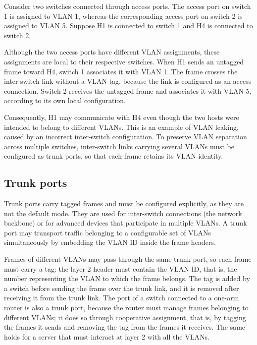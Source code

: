 \begin{center}
\end{center}
Consider two switches connected through access ports. The access port on switch 1 is assigned to VLAN 1, whereas the corresponding access port on switch 2 is assigned to VLAN 5. Suppose H1 is connected to switch 1 and H4 is connected to switch 2.

Although the two access ports have different VLAN assignments, these assignments are local to their respective switches. When H1 sends an untagged frame toward H4, switch 1 associates it with VLAN 1. The frame crosses the inter-switch link without a VLAN tag, because the link is configured as an access connection. Switch 2 receives the untagged frame and associates it with VLAN 5, according to its own local configuration.

Consequently, H1 may communicate with H4 even though the two hosts were intended to belong to different VLANs. This is an example of VLAN leaking, caused by an incorrect inter-switch configuration. To preserve VLAN separation across multiple switches, inter-switch links carrying several VLANs must be configured as trunk ports, so that each frame retains its VLAN identity.

\subsection{Trunk ports}

Trunk ports carry tagged frames and must be configured explicitly, as they are not the default mode. They are used for inter-switch connections (the network backbone) or for advanced devices that participate in multiple VLANs. A trunk port may transport traffic belonging to a configurable set of VLANs simultaneously by embedding the VLAN ID inside the frame headers.


Frames of different VLANs may pass through the same trunk port, so each frame must carry a tag: the layer 2 header must contain the VLAN ID, that is, the number representing the VLAN to which the frame belongs. The tag is added by a switch before sending the frame over the trunk link, and it is removed after receiving it from the trunk link. The port of a switch connected to a one-arm router is also a trunk port, because the router must manage frames belonging to different VLANs; it does so through cooperative assignment, that is, by tagging the frames it sends and removing the tag from the frames it receives. The same holds for a server that must interact at layer 2 with all the VLANs.
\begin{center}
\end{center}


